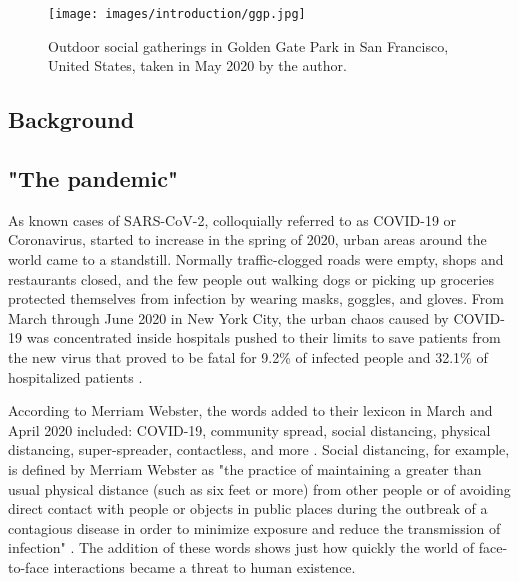  \begin{figure}[h!]
  \centering
  \texttt{[image: images/introduction/ggp.jpg]}
  \captionsetup{width=0.8\linewidth}
  \caption[Golden Gate Park]{Outdoor social gatherings in Golden Gate Park in San Francisco, United States, taken in May 2020 by the author.}
  \label{fig:golden_gate}
\end{figure}

\begin{multicols}{2}

\section{Background}
\subsection{"The pandemic"}
As known cases of SARS-CoV-2, colloquially referred to as COVID-19 or Coronavirus, started to increase in the spring of 2020, urban areas around the world came to a standstill. Normally traffic-clogged roads were empty, shops and restaurants closed, and the few people out walking dogs or picking up groceries protected themselves from infection by wearing masks, goggles, and gloves. From March through June 2020 in New York City, the urban chaos caused by COVID-19 was concentrated inside hospitals pushed to their limits to save patients from the new virus that proved to be fatal for 9.2\% of infected people and 32.1\% of hospitalized patients \cite{thompson_covid-19_2020}.

According to Merriam Webster, the words added to their lexicon in March and April 2020 included: COVID-19, community spread, social distancing, physical distancing, super-spreader, contactless, and more \cite{noauthor_coronavirus_nodate}. Social distancing, for example, is defined by Merriam Webster as "the practice of maintaining a greater than usual physical distance (such as six feet or more) from other people or of avoiding direct contact with people or objects in public places during the outbreak of a contagious disease in order to minimize exposure and reduce the transmission of infection" \cite{noauthor_social_nodate}. The addition of these words shows just how quickly the world of face-to-face interactions became a threat to human existence.  


\end{multicols}
